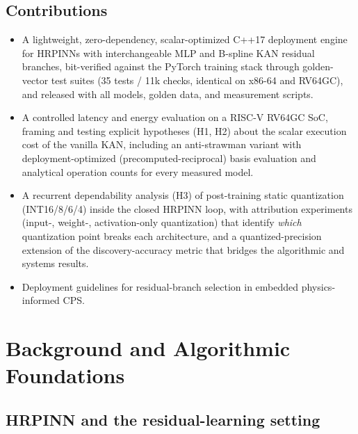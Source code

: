 \documentclass[conference]{IEEEtran}
\begin{document}
\subsection{Contributions}
\begin{itemize}
\item A lightweight, zero-dependency, scalar-optimized C++17 deployment
engine for HRPINNs with interchangeable MLP and B-spline KAN residual
branches, bit-verified against the PyTorch training stack through golden-vector
test suites (35 tests / 11k checks, identical on x86-64 and RV64GC), and
released with all models, golden data, and measurement scripts.
\item A controlled latency and energy evaluation on a RISC-V RV64GC SoC,
framing and testing explicit hypotheses (H1, H2) about the scalar execution
cost of the vanilla KAN, including an anti-strawman variant with
deployment-optimized (precomputed-reciprocal) basis evaluation and analytical
operation counts for every measured model.
\item A recurrent dependability analysis (H3) of post-training static
quantization (INT16/8/6/4) inside the closed HRPINN loop, with attribution
experiments (input-, weight-, activation-only quantization) that identify
\emph{which} quantization point breaks each architecture, and a
quantized-precision extension of the discovery-accuracy metric that bridges
the algorithmic and systems results.
\item Deployment guidelines for residual-branch selection in embedded
physics-informed CPS.
\end{itemize}

\section{Background and Algorithmic Foundations}
\label{sec:foundations}

\subsection{HRPINN and the residual-learning setting}
\end{document}
